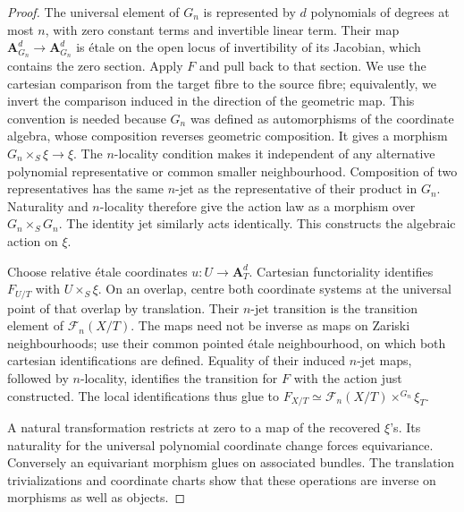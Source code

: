 \begin{proof}
The universal element of $G_n$ is represented by $d$ polynomials of degrees
at most $n$, with zero constant terms and invertible linear term. Their map
$\mathbf A^d_{G_n}\to\mathbf A^d_{G_n}$ is \'{e}tale on the open locus of
invertibility of its Jacobian, which contains the zero section. Apply $F$
and pull back to that section. We use the cartesian comparison from the
target fibre to the source fibre; equivalently, we invert the comparison
induced in the direction of the geometric map. This convention is needed
because $G_n$ was defined as automorphisms of the coordinate algebra,
whose composition reverses geometric composition. It gives a morphism
$G_n\times_S\xi\to\xi$. The $n$-locality condition makes it independent
of any alternative polynomial representative or common smaller
neighbourhood. Composition of two representatives has the same $n$-jet as
the representative of their product in $G_n$. Naturality and $n$-locality
therefore give the action law as a morphism over $G_n\times_S G_n$.
The identity jet similarly acts identically. This constructs the algebraic
action on $\xi$.

Choose relative \'{e}tale coordinates $u:U\to\mathbf A^d_T$. Cartesian
functoriality identifies $F_{U/T}$ with $U\times_S\xi$. On an overlap,
centre both coordinate systems at the universal point of that overlap by
translation. Their $n$-jet transition is the transition element of
$\mathcal F_n(X/T)$. The maps need not be inverse as maps on Zariski
neighbourhoods; use their common pointed \'{e}tale neighbourhood, on which
both cartesian identifications are defined. Equality of their induced
$n$-jet maps, followed by $n$-locality, identifies the transition for $F$
with the action just constructed. The local identifications thus glue to
$F_{X/T}\simeq\mathcal F_n(X/T)\times^{G_n}\xi_T$.

A natural transformation restricts at zero to a map of the recovered
$\xi$'s. Its naturality for the universal polynomial coordinate change
forces equivariance. Conversely an equivariant morphism glues on associated
bundles. The translation trivializations and coordinate charts show that
these operations are inverse on morphisms as well as objects.
\end{proof}

